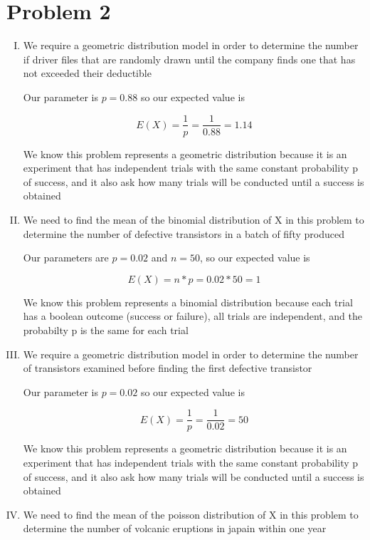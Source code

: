 \documentclass[14pt]{article}
\begin{document}
\section*{Problem 2}
\begin{enumerate}[I.]
\item
We require a geometric distribution model in order to determine the number if driver files that are randomly drawn until the company finds one that has not exceeded their deductible 

Our parameter is $p = 0.88$ so our expected value is

\[ E(X) = \frac{1}{p} = \frac{1}{0.88} = 1.14 \]

We know this problem represents a geometric distribution because it is an experiment that has independent trials with the same constant probability p of success, and it also ask how many trials will be conducted until a success is obtained \\


\item
We need to find the mean of the binomial distribution of X in this problem to determine the number of defective transistors in a batch of fifty produced 

Our parameters are $p = 0.02$ and $n = 50$, so our expected value is

\[ E(X) = n*p = 0.02 * 50 = 1  \]

We know this problem represents a binomial distribution because each trial has a boolean outcome (success or failure), all trials are independent, and the probabilty p is the same for each trial \\

\item
We require a geometric distribution model in order to determine the number of transistors examined before finding the first defective transistor

Our parameter is $p = 0.02$ so our expected value is

\[ E(X) = \frac{1}{p} = \frac{1}{0.02} = 50 \]

We know this problem represents a geometric distribution because it is an experiment that has independent trials with the same constant probability p of success, and it also ask how many trials will be conducted until a success is obtained \pagebreak

\item
We need to find the mean of the poisson distribution of X in this problem to determine the number of volcanic eruptions in japain within one year


\end{enumerate}
\end{document}
